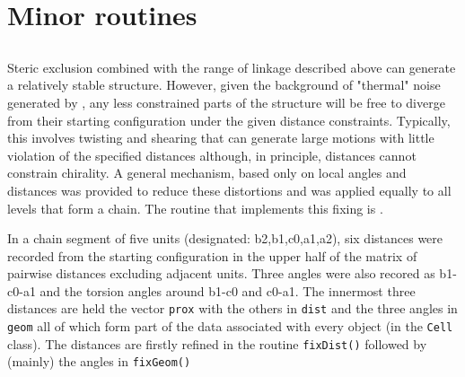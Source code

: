 
\section{Minor routines}

\subsection{}

Steric exclusion combined with the range of linkage described above can generate
a relatively stable structure.   However, given the background of "thermal" noise
generated by , any less constrained parts of the structure will be free
to diverge from their starting configuration under the given distance constraints. 
Typically, this involves twisting and shearing that can generate large motions with
little violation of the specified distances although, in principle, distances cannot
constrain chirality.  A general mechanism, based only on local angles and distances
was provided to reduce these distortions and was applied equally to all levels
that form a chain.  The routine that implements this fixing is .

In a chain segment of five units (designated: b2,b1,c0,a1,a2), six distances were
recorded from the starting configuration in the upper half of the matrix of pairwise
distances excluding adjacent units.  Three angles were also recored as b1-c0-a1 and
the torsion angles around b1-c0 and c0-a1.   The innermost three distances are held
the vector {\tt prox} with the others in {\tt dist} and the three angles in {\tt geom}
all of which form part of the data associated with every object (in the {\tt Cell} class).
The distances are firstly refined in the routine {\tt fixDist()} followed by (mainly)
the angles in {\tt fixGeom()}

